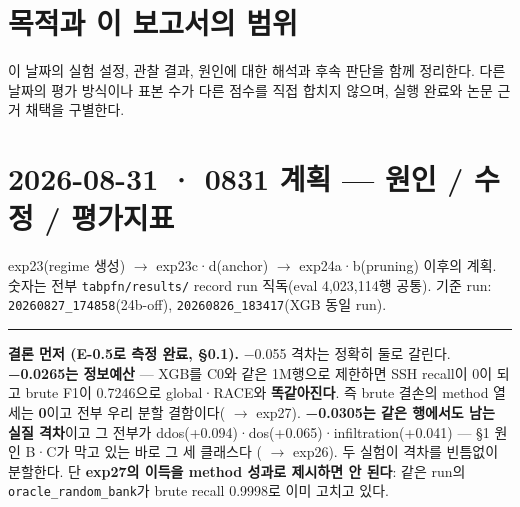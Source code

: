 




\section*{목적과 이 보고서의 범위}

이 날짜의 실험 설정, 관찰 결과, 원인에 대한 해석과 후속 판단을 함께 정리한다. 다른 날짜의 평가 방식이나 표본 수가 다른 점수를 직접 합치지 않으며, 실행 완료와 논문 근거 채택을 구별한다.


\section{2026-08-31 · 0831 계획 — 원인 /\allowbreak{} 수정 /\allowbreak{} 평가지표}
\label{report:20260831_0831}
exp23(regime 생성)  \ensuremath{\rightarrow}  exp23c·d(anchor)  \ensuremath{\rightarrow}  exp24a·b(pruning) 이후의 계획. 숫자는 전부 \texttt{tabpfn/\allowbreak{}\allowbreak{}r\allowbreak{}esults/\allowbreak{}\allowbreak{}} record run 직독(eval 4,023,114행 공통). 기준 run: \texttt{20260827\allowbreak{}\_\allowbreak{}\allowbreak{}174858}(24b-off), \texttt{20260826\allowbreak{}\_\allowbreak{}\allowbreak{}183417}(XGB 동일 run).


\medskip\hrule\medskip
\textbf{결론 먼저 (E-0.5로 측정 완료, §0.1).} −0.055 격차는 정확히 둘로 갈린다. \textbf{−0.0265는 정보예산} — XGB를 C0와 같은 1M행으로 제한하면 SSH recall이 0이 되고 brute F1이 0.7246으로 global·RACE와 \textbf{똑같아진다}. 즉 brute 결손의 method 열세는 \textbf{0}이고 전부 우리 분할 결함이다( \ensuremath{\rightarrow}  exp27). \textbf{−0.0305는 같은 행에서도 남는 실질 격차}이고 그 전부가 ddos(+\allowbreak{}0.094)·dos(+\allowbreak{}0.065)·infiltration(+\allowbreak{}0.041) — §1 원인 B·C가 막고 있는 바로 그 세 클래스다 ( \ensuremath{\rightarrow}  exp26). 두 실험이 격차를 빈틈없이 분할한다. 단 \textbf{exp27의 이득을 method 성과로 제시하면 안 된다}: 같은 run의 \texttt{oracle\_\allowbreak{}\allowbreak{}r\allowbreak{}andom\_\allowbreak{}\allowbreak{}ba\allowbreak{}nk}가 brute recall 0.9998로 이미 고치고 있다.


